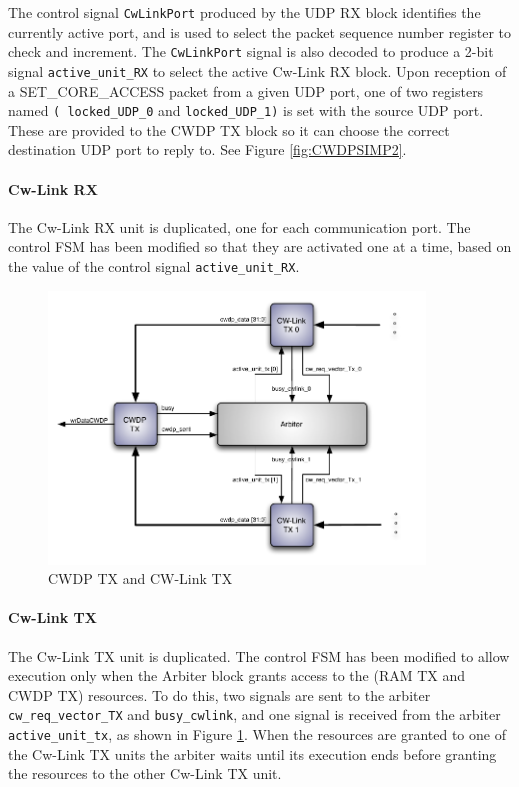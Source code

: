 \documentclass[conference]{IEEEtran}
\begin{document}
The control signal {\tt CwLinkPort} produced by the UDP RX block identifies the currently active port, and is used to select the packet sequence number register to check and increment. The \texttt{CwLinkPort} signal is also decoded to produce a 2-bit signal \texttt{active\_unit\_RX} to select the active Cw-Link RX block. Upon reception of a SET\_CORE\_ACCESS packet from a given UDP port, one of two registers named {\tt( locked\_UDP\_0} and {\tt locked\_UDP\_1)} is set with the source UDP port. These are provided to the CWDP TX block so it can choose the correct destination UDP port to reply to. See Figure \ref{fig:CWDPSIMP2}.


\paragraph*{Cw-Link RX} The Cw-Link RX unit is duplicated, one for each communication port. The control FSM has been modified so that they are activated one at a time, based on the value of the control signal {\tt active\_unit\_RX}.

\begin{figure}[h]
  \centering
      \includegraphics[width=10cm,center]{Diagrams/CWDP-TX-Detail.pdf}
  \caption{CWDP TX and CW-Link TX}\label{fig:CWDP-TX}
\end{figure}

\paragraph*{Cw-Link TX} The Cw-Link TX unit is duplicated. The control FSM has been modified to allow execution only when the Arbiter block grants access to the (RAM TX and CWDP TX) resources. To do this, two signals are sent to the arbiter \texttt{cw\_req\_vector\_TX} and \texttt{busy\_cwlink}, and one signal is received from the arbiter \texttt{active\_unit\_tx}, as shown in Figure \ref{fig:CWDP-TX}. When the resources are granted to one of the Cw-Link TX units the arbiter waits until its execution ends before granting the resources to the other Cw-Link TX unit.
\end{document}
